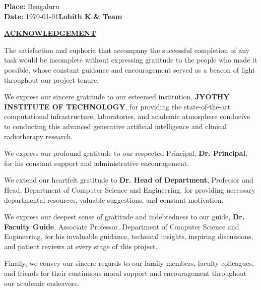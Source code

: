 \documentclass[12pt,a4paper]{report}
\newcommand{\CollegeName}{JYOTHY INSTITUTE OF TECHNOLOGY}
\begin{document}
\vspace{35pt}
\noindent
\textbf{Place:} Bengaluru\\
\textbf{Date:} \today \hfill \textbf{Lohith K \& Team}

\newpage
\begin{center}
{\fontsize{16}{20}\selectfont\bfseries\underline{ACKNOWLEDGEMENT}}
\end{center}
\vspace{15pt}
The satisfaction and euphoria that accompany the successful completion of any task would be incomplete without expressing gratitude to the people who made it possible, whose constant guidance and encouragement served as a beacon of light throughout our project tenure.

We express our sincere gratitude to our esteemed institution, \textbf{\CollegeName}, for providing the state-of-the-art computational infrastructure, laboratories, and academic atmosphere conducive to conducting this advanced generative artificial intelligence and clinical radiotherapy research.

We express our profound gratitude to our respected Principal, \textbf{Dr. Principal}, for his constant support and administrative encouragement.

We extend our heartfelt gratitude to \textbf{Dr. Head of Department}, Professor and Head, Department of Computer Science and Engineering, for providing necessary departmental resources, valuable suggestions, and constant motivation.

We express our deepest sense of gratitude and indebtedness to our guide, \textbf{Dr. Faculty Guide}, Associate Professor, Department of Computer Science and Engineering, for his invaluable guidance, technical insights, inspiring discussions, and patient reviews at every stage of this project.

Finally, we convey our sincere regards to our family members, faculty colleagues, and friends for their continuous moral support and encouragement throughout our academic endeavors.
\end{document}
